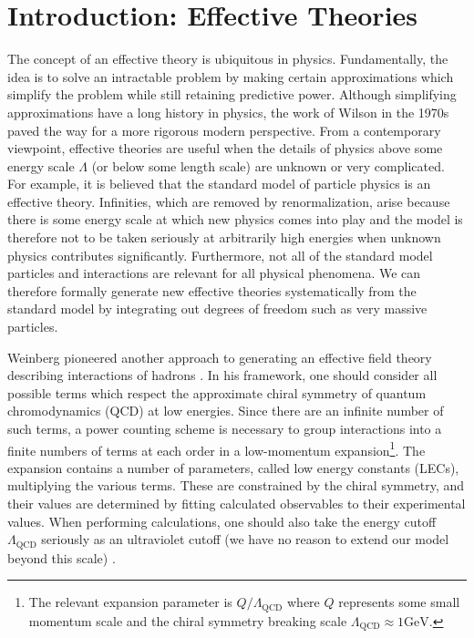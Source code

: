 \chapter{\label{chap:Introduction}Introduction: Effective Theories}

The concept of an effective theory is ubiquitous in physics. Fundamentally, the idea is to solve an intractable problem by making certain approximations which simplify the problem while still retaining predictive power. Although simplifying approximations have a long history in physics,  the work of Wilson \cite{Wilson197475} in the 1970s paved the way for a more rigorous modern perspective. From a contemporary viewpoint, effective theories are useful when the details of physics above some energy scale $\Lambda$ (or below some length scale) are unknown or very complicated. For example, it is believed that the standard model of particle physics is an effective theory. Infinities, which are removed by renormalization, arise because there is some energy scale at which new physics comes into play and the model is therefore not to be taken seriously at arbitrarily high energies when unknown physics contributes significantly. Furthermore, not all of the standard model particles and interactions are relevant for all physical phenomena. We can therefore formally generate new effective theories systematically from the standard model by integrating out degrees of freedom such as very massive particles.

Weinberg pioneered another approach to generating an effective field theory describing interactions of hadrons \cite{WEINBERG1990288}. In his framework, one should consider all possible terms which respect the approximate chiral symmetry of quantum chromodynamics (QCD) at low energies. Since there are an infinite number of such terms, a power counting scheme is necessary to group interactions into a finite numbers of terms at each order in a low-momentum expansion\footnote{The relevant expansion parameter is $Q/\Lambda_{\text{QCD}}$ where $Q$ represents some small momentum scale and the chiral symmetry breaking scale $\Lambda_{\text{QCD}}\approx 1\text{GeV}$.}. The expansion contains a number of parameters, called low energy constants (LECs), multiplying the various terms. These are constrained by the chiral symmetry, and their values are determined by fitting calculated observables to their experimental values. When performing calculations, one should also take the energy cutoff $\Lambda_{\text{QCD}}$ seriously as an ultraviolet cutoff (we have no reason to extend our model beyond this scale) \cite{Epelbaum2013}. 

